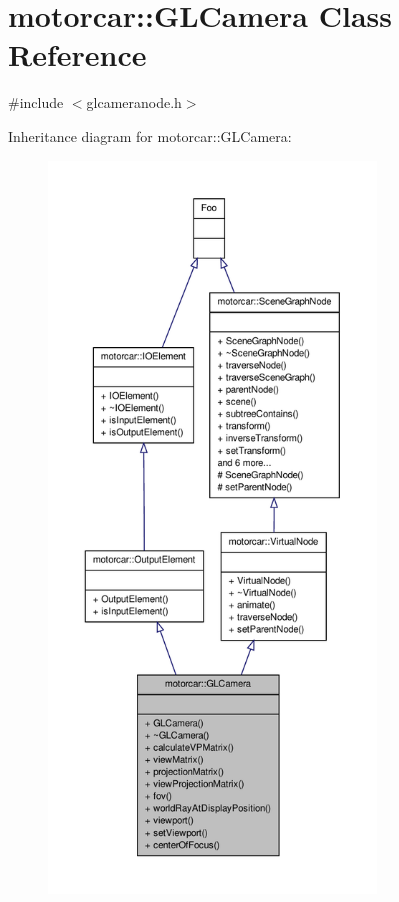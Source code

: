 \hypertarget{classmotorcar_1_1GLCamera}{\section{motorcar\-:\-:G\-L\-Camera Class Reference}
\label{classmotorcar_1_1GLCamera}
}


{\ttfamily \#include $<$glcameranode.\-h$>$}



Inheritance diagram for motorcar\-:\-:G\-L\-Camera\-:
\nopagebreak
\begin{figure}[H]
\begin{center}
\leavevmode
\includegraphics[height=550pt]{classmotorcar_1_1GLCamera__inherit__graph}
\end{center}
\end{figure}


